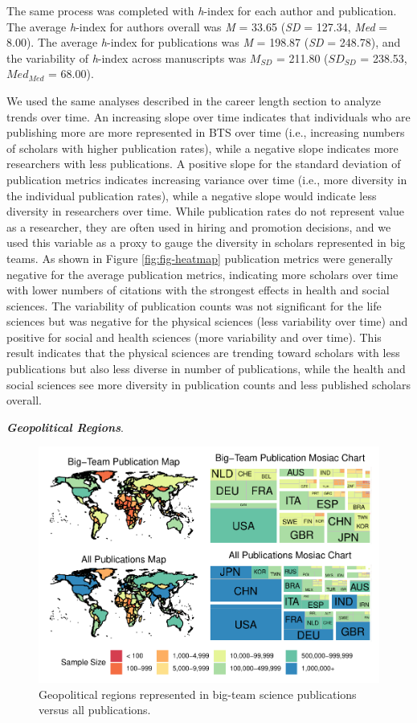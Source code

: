 \documentclass[
  man,floatsintext]{apa6}
\begin{document}
The same process was completed with \emph{h}-index for each author and
publication. The average \emph{h}-index for authors overall was \emph{M} =
33.65 (\emph{SD} = 127.34, \emph{Med} = 8.00). The
average \emph{h}-index for publications was \emph{M} = 198.87 (\emph{SD}
= 248.78), and the variability of \emph{h}-index across
manuscripts was \(M_{SD}\) = 211.80 (\(SD_{SD}\) =
238.53, \(Med_{Med}\) = 68.00).

We used the same analyses described in the career length section to analyze trends over time. An increasing slope over time indicates that individuals who are publishing more are more represented in BTS over time (i.e., increasing numbers of scholars with higher publication rates), while a negative slope indicates more researchers with less publications. A positive slope for the standard deviation of publication metrics indicates increasing variance over time (i.e., more diversity in the individual publication rates), while a negative slope would indicate less diversity in researchers over time. While publication rates do not represent value as a researcher, they are often used in hiring and promotion decisions, and we used this variable as a proxy to gauge the diversity in scholars represented in big teams. As shown in Figure \ref{fig:fig-heatmap} publication metrics were generally negative for the average publication metrics, indicating more scholars over time with lower numbers of citations with the strongest effects in health and social sciences. The variability of publication counts was not significant for the life sciences but was negative for the physical sciences (less variability over time) and positive for social and health sciences (more variability and over time). This result indicates that the physical sciences are trending toward scholars with less publications but also less diverse in number of publications, while the health and social sciences see more diversity in publication counts and less published scholars overall.

\textbf{\emph{Geopolitical Regions}}.

\begin{figure}
\centering
\includegraphics{manuscript_scopus_files/figure-latex/fig-map-both-1.pdf}
\caption{\label{fig:fig-map-both}Geopolitical regions represented in big-team science publications versus all publications.}
\end{figure}
\end{document}
